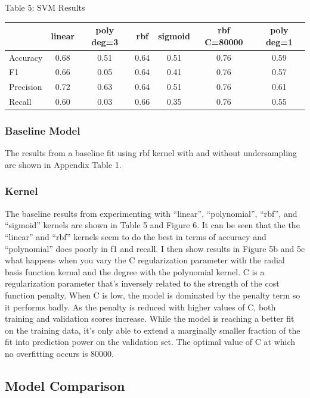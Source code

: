 \documentclass{article}
\begin{document}
\begin{table}
	
	\centering
	Table 5: SVM Results \\
	\begin{tabular}{ l c c c c c c}
		\hline
		& linear & poly deg=3 & rbf & sigmoid & rbf C=80000 & poly deg=1\\
		\hline
		Accuracy & 0.68 & 0.51 & 0.64 & 0.51 & 0.76 & 0.59\\
		F1 & 0.66 & 0.05 & 0.64 & 0.41 & 0.76 & 0.57 \\
		Precision & 0.72 & 0.63 & 0.64 & 0.51 & 0.76 & 0.61\\
		Recall & 0.60 & 0.03 & 0.66 & 0.35 & 0.76 & 0.55\\
		\hline 
	\end{tabular}
\end{table}

\subsubsection*{Baseline Model}
The results from a baseline fit using rbf kernel with and without undersampling are shown in Appendix Table 1. 

\subsubsection*{Kernel}
The baseline results from experimenting with ``linear'', ``polynomial'', ``rbf'', and ``sigmoid'' kernels are shown in Table 5 and Figure 6. It can be seen that the the ``linear'' and ``rbf'' kernels seem to do the best in terms of accuracy and ``polynomial'' does poorly in f1 and recall. I then show results in Figure 5b and 5c what happens when you vary the C regularization parameter with the radial basis function kernal and the degree with the polynomial kernel. C is a regularization parameter that's inversely related to the strength of the cost function penalty. When C is low, the model is dominated by the penalty term so it performs badly. As the penalty is reduced with higher values of C, both training and validation scores increase. While the model is reaching a better fit on the training data, it's only able to extend a marginally smaller fraction of the fit into prediction power on the validation set. The optimal value of C at which no overfitting occurs is 80000. 

\subsection{Model Comparison}
\end{document}
